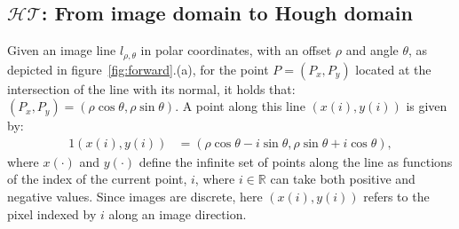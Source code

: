 \documentclass[runningheads]{llncs}
\begin{document}
\subsection{$\mathcal{HT}$: From image domain to Hough domain}
Given an image line $l_{\rho, \theta}$ in polar coordinates, with an offset $\rho$ and angle $\theta$, as depicted in figure~\ref{fig:forward}.(a), 
for the point $P=(P_x, P_y)$ located at the intersection of the line with its normal, it holds that: $(P_x, P_y) = (\rho \cos \theta, \rho \sin \theta)$. A  point along this line $(x(i), y(i))$ is given by:
\begin{alignat}{1}
    (x(i), y(i)) &= (\rho \cos \theta - i \sin \theta, \rho \sin \theta + i \cos{} \theta),
\label{eq:line}    
\end{alignat}
where $x(\cdot)$ and $y(\cdot)$ define the infinite set of points along the line as functions of the index of the current point, $i$, where $i \in \mathbb{R}$ can take both positive and negative values.  
Since images are discrete, here $(x(i), y(i))$ refers to the pixel indexed by $i$ along an image direction. 
\end{document}
